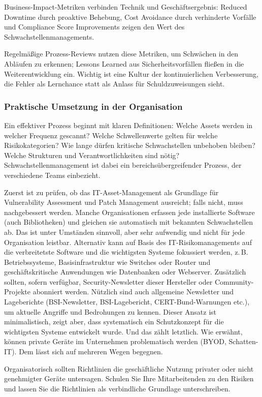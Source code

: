 Business-Impact-Metriken verbinden Technik und Geschäftsergebnis: Reduced Downtime durch proaktive Behebung, Cost Avoidance durch verhinderte Vorfälle und Compliance Score Improvements zeigen den Wert des Schwachstellenmanagements.

Regelmäßige Prozess-Reviews nutzen diese Metriken, um Schwächen in den Abläufen zu erkennen; Lessons Learned aus Sicherheitsvorfällen fließen in die Weiterentwicklung ein. Wichtig ist eine Kultur der kontinuierlichen Verbesserung, die Fehler als Lernchance statt als Anlass für Schuldzuweisungen sieht.

\subsubsection{Praktische Umsetzung in der Organisation}

Ein effektiver Prozess beginnt mit klaren Definitionen: Welche Assets werden in welcher Frequenz gescannt? Welche Schwellenwerte gelten für welche Risikokategorien? Wie lange dürfen kritische Schwachstellen unbehoben bleiben? Welche Strukturen und Verantwortlichkeiten sind nötig? Schwachstellenmanagement ist dabei ein bereichsübergreifender Prozess, der verschiedene Teams einbezieht.

Zuerst ist zu prüfen, ob das IT-Asset-Management als Grundlage für Vulnerability Assessment und Patch Management ausreicht; falls nicht, muss nachgebessert werden. Manche Organisationen erfassen jede installierte Software (auch Bibliotheken) und gleichen sie automatisch mit bekannten Schwachstellen ab. Das ist unter Umständen sinnvoll, aber sehr aufwendig und nicht für jede Organisation leistbar. Alternativ kann auf Basis des IT-Risikomanagements auf die verbreitetste Software und die wichtigsten Systeme fokussiert werden, z.\,B. Betriebssysteme, Basisinfrastruktur wie Switches oder Router und geschäftskritische Anwendungen wie Datenbanken oder Webserver. Zusätzlich sollten, sofern verfügbar, Security-Newsletter dieser Hersteller oder Community-Projekte abonniert werden. Nützlich sind auch allgemeine Newsletter und Lageberichte (BSI-Newsletter, BSI-Lagebericht, CERT-Bund-Warnungen etc.), um aktuelle Angriffe und Bedrohungen zu kennen. Dieser Ansatz ist minimalistisch, zeigt aber, dass systematisch ein Schutzkonzept für die wichtigsten Systeme entwickelt wurde. Und das zählt letztlich.
\newpage
Wie erwähnt, können private Geräte im Unternehmen problematisch werden (BYOD, Schatten-IT). Dem lässt sich auf mehreren Wegen begegnen.

Organisatorisch sollten Richtlinien die geschäftliche Nutzung privater oder nicht genehmigter Geräte untersagen. Schulen Sie Ihre Mitarbeitenden zu den Risiken und lassen Sie die Richtlinien als verbindliche Grundlage unterschreiben.

